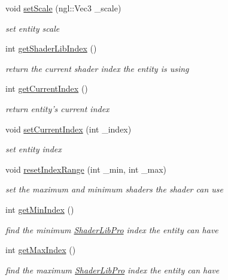 \begin{DoxyCompactItemize}
void \hyperlink{class_entity_aebf26c8845b31f35104b91be523e84f9}{set\-Scale} (ngl\-::\-Vec3 \-\_\-scale)
\begin{DoxyCompactList}\small\item\em set entity scale \end{DoxyCompactList}\item 
int \hyperlink{class_entity_a00a43361a05770b2999ca90c612a159f}{get\-Shader\-Lib\-Index} ()
\begin{DoxyCompactList}\small\item\em return the current shader index the entity is using \end{DoxyCompactList}\item 
int \hyperlink{class_entity_a978bc19f08fed863dfb38d07f069430a}{get\-Current\-Index} ()
\begin{DoxyCompactList}\small\item\em return entity's current index \end{DoxyCompactList}\item 
void \hyperlink{class_entity_a26225c51294cbd3df67c53f29c6335b2}{set\-Current\-Index} (int \-\_\-index)
\begin{DoxyCompactList}\small\item\em set entity index \end{DoxyCompactList}\item 
void \hyperlink{class_entity_a4fa70ecbdba0609d08a6cb8d385031b1}{reset\-Index\-Range} (int \-\_\-min, int \-\_\-max)
\begin{DoxyCompactList}\small\item\em set the maximum and minimum shaders the shader can use \end{DoxyCompactList}\item 
int \hyperlink{class_entity_a1ccffcd9ad3ad9c44040ef7140758ddb}{get\-Min\-Index} ()
\begin{DoxyCompactList}\small\item\em find the minimum \hyperlink{class_shader_lib_pro}{Shader\-Lib\-Pro} index the entity can have \end{DoxyCompactList}\item 
int \hyperlink{class_entity_a6f4cf5bb25ba1210953d3d57130ce285}{get\-Max\-Index} ()
\begin{DoxyCompactList}\small\item\em find the maximum \hyperlink{class_shader_lib_pro}{Shader\-Lib\-Pro} index the entity can have \end{DoxyCompactList}\item 

\end{DoxyCompactItemize}

